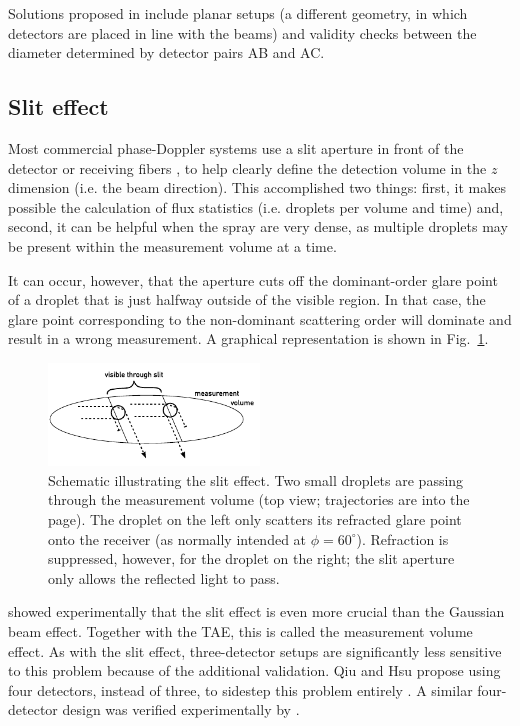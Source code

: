 \documentclass[11.5pt,oneside]{book}
\newcommand*{\figref}[1]{Fig.~\ref{#1}}
\begin{document}
Solutions proposed in \citet{Albrecht03} include planar setups (a different
geometry, in which detectors are placed in line with the beams) and validity
checks between the diameter determined by detector pairs AB and AC.

\subsection{Slit effect}
Most commercial phase-Doppler systems use a slit aperture in front of the
detector or receiving fibers \cite{Albrecht03}, to help clearly define the
detection volume in the $z$ dimension (i.e. the beam direction). This
accomplished two things: first, it makes possible the calculation of flux
statistics (i.e. droplets per volume and time) and, second, it can be
helpful when the spray are very dense, as multiple droplets may be present
within the measurement volume at a time.

It can occur, however, that the aperture cuts off the dominant-order glare point
of a droplet that is just halfway outside of the visible region. In that case,
the glare point corresponding to the non-dominant scattering order will
dominate and result in a wrong measurement. A graphical representation is shown
in \figref{fig:sliteffect}. 

\begin{figure}
    \centering
    \includegraphics[width=0.5\textwidth]{img/setup/sliteffect.pdf}
    \caption{Schematic illustrating the slit effect. Two small droplets are
    passing through the measurement volume (top view; trajectories are into the
page). The droplet on the left only scatters its refracted glare point onto the
receiver (as normally intended at $\phi=60^\circ$). Refraction is suppressed,
however, for the droplet on the right; the slit aperture only allows the
reflected light to pass. \label{fig:sliteffect}}
\end{figure}

\citet{Durst94} showed experimentally that the slit effect is even more crucial than
the Gaussian beam effect. Together with the TAE, this
is called the measurement volume effect. As with the slit effect, three-detector
setups are significantly less sensitive to this problem because of the
additional validation. Qiu and Hsu propose using four detectors, instead of
three, to sidestep this problem entirely \cite{Qiu99}. A similar four-detector design was
verified experimentally by \citet{Sipperley14}.
\end{document}
